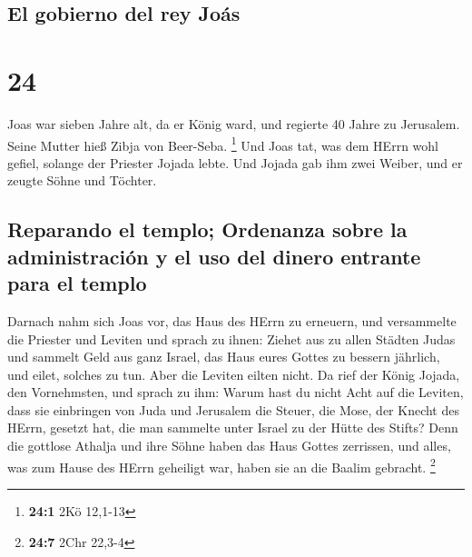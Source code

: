 \hypertarget{el-gobierno-del-rey-jouxe1s}{%
\subsection{El gobierno del rey
Joás}\label{el-gobierno-del-rey-jouxe1s}}

\hypertarget{section-23}{%
\section{24}\label{section-23}}

 Joas war sieben Jahre alt, da er König ward, und regierte
40 Jahre zu Jerusalem. Seine Mutter hieß Zibja von Beer-Seba.
\footnote{\textbf{24:1} 2Kö 12,1-13}  Und Joas tat, was
dem HErrn wohl gefiel, solange der Priester Jojada lebte. 
Und Jojada gab ihm zwei Weiber, und er zeugte Söhne und Töchter.

\hypertarget{reparando-el-templo-ordenanza-sobre-la-administraciuxf3n-y-el-uso-del-dinero-entrante-para-el-templo}{%
\subsection{Reparando el templo; Ordenanza sobre la administración y el
uso del dinero entrante para el
templo}\label{reparando-el-templo-ordenanza-sobre-la-administraciuxf3n-y-el-uso-del-dinero-entrante-para-el-templo}}

 Darnach nahm sich Joas vor, das Haus des HErrn zu
erneuern,  und versammelte die Priester und Leviten und
sprach zu ihnen: Ziehet aus zu allen Städten Judas und sammelt Geld aus
ganz Israel, das Haus eures Gottes zu bessern jährlich, und eilet,
solches zu tun. Aber die Leviten eilten nicht.  Da rief
der König Jojada, den Vornehmsten, und sprach zu ihm: Warum hast du
nicht Acht auf die Leviten, dass sie einbringen von Juda und Jerusalem
die Steuer, die Mose, der Knecht des HErrn, gesetzt hat, die man
sammelte unter Israel zu der Hütte des Stifts?  Denn die
gottlose Athalja und ihre Söhne haben das Haus Gottes zerrissen, und
alles, was zum Hause des HErrn geheiligt war, haben sie an die Baalim
gebracht. \footnote{\textbf{24:7} 2Chr 22,3-4}

